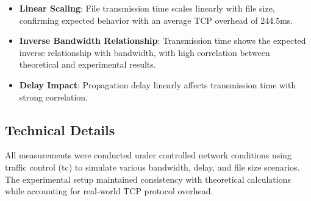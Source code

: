 \documentclass[11pt,letterpaper]{article}
\begin{document}
\begin{itemize}
    \item \textbf{Linear Scaling}:
    File transmission time scales linearly with file size,
    confirming expected behavior with an average TCP overhead of 244.5ms.
    
    \item \textbf{Inverse Bandwidth Relationship}:
    Transmission time shows the expected inverse relationship with bandwidth,
    with high correlation between theoretical and experimental results.
    
    \item \textbf{Delay Impact}:
    Propagation delay linearly affects transmission time with strong correlation.
    
\end{itemize}

\subsection{Technical Details}

All measurements were conducted under controlled network conditions using traffic control (tc) to simulate various bandwidth, delay, and file size scenarios. The experimental setup maintained consistency with theoretical calculations while accounting for real-world TCP protocol overhead.

\end{document}
